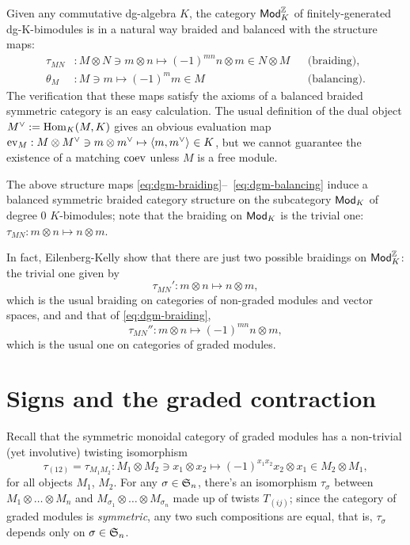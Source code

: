 Given any commutative dg-algebra $K$, the category $\mathsf{Mod}_K^{\mathbb{Z}}$ of
finitely-generated dg-K-bimodules is in a natural way braided and
balanced with the structure maps:
\begin{align}
  \label{eq:dgm-braiding}
  \tau_{MN} &: M \otimes N \ni m\otimes n \mapsto (-1)^{mn}n\otimes m \in N \otimes M
  &&
  \text{(braiding),}
  \\
  \label{eq:dgm-balancing}
  \theta_M &: M \ni m \mapsto (-1)^mm \in M
  &&
  \text{(balancing).}
\end{align}
The verification that these maps satisfy the axioms of a balanced
braided symmetric category is an easy calculation.  The usual
definition of the dual object $\rdl{M} := \Hom_K(M, K)$ gives an
obvious evaluation map $\ev_M : M \otimes \rdl{M} \ni m \otimes \rdl{m} \mapsto
\pairing{m}{\rdl{m}} \in K$, but we cannot guarantee the existence of a
matching $\operatorname{coev}$ unless $M$ is a free module.

The above structure maps
\eqref{eq:dgm-braiding}--~\eqref{eq:dgm-balancing} induce a balanced
symmetric braided category structure on the subcategory $\mathsf{Mod}_K$ of
degree $0$ $K$-bimodules; note that the braiding on $\mathsf{Mod}_K$ is the
trivial one: $\tau_{MN}: m\otimes n \mapsto n\otimes m$.
\begin{remark}
  In fact, Eilenberg-Kelly \cite{eilenberg-kelly;monoidal-categories}
  show that there are just two possible braidings on $\mathsf{Mod}_K^{\mathbb{Z}}$:
  the trivial one given by
  \begin{equation*}
    \tau_{MN}' : m\otimes n \mapsto n\otimes m,
  \end{equation*}
  which is the usual braiding on categories of non-graded modules and
  vector spaces, and and that of \eqref{eq:dgm-braiding},
  \begin{equation*}
    \tau_{MN}'' : m\otimes n \mapsto (-1)^{mn} n\otimes m,
  \end{equation*}
  which is the usual one on categories of graded modules.
\end{remark}


\section{Signs and the graded contraction}
\label{sec:signs}

Recall that the symmetric monoidal category of graded modules has a
non-trivial (yet involutive) twisting isomorphism
\begin{equation*}
\tau_{(12)} = \tau_{M_1M_2} : M_1
\otimes M_2 \ni x_1\otimes x_2 \mapsto (-1)^{x_1x_2} x_2\otimes x_1
\in M_2\otimes M_1,
\end{equation*}
for all objects $M_1$, $M_2$. For any
$\sigma\in\mathfrak{S}_{n}$, there's an isomorphism $\tau_\sigma$ between
$M_1\otimes \dots \otimes M_n$ and $M_{\sigma_1} \otimes \dots
\otimes M_{\sigma_n}$ made up of twists $T_{(ij)}$; since the
category of graded modules is \emph{symmetric}, any two such
compositions are equal, that is, $\tau_\sigma$ depends only on
$\sigma\in\mathfrak{S}_{n}$.

